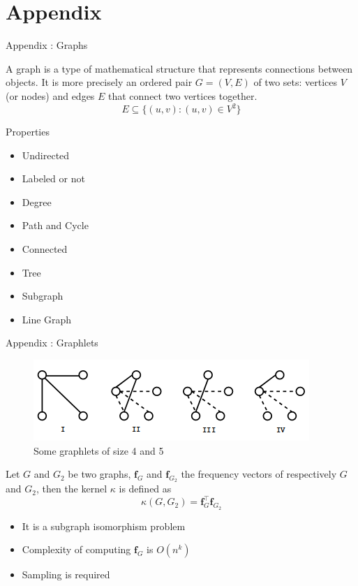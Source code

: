 \documentclass[compress]{beamer}
\let\vec\mathbf
\begin{document}
\section[]{Appendix}
\begin{frame}[noframenumbering]{Appendix : Graphs}
\begin{definition}
	A graph\cite{bondy1976graph} is a type of mathematical structure that represents connections between objects. It is more precisely an ordered pair $G=(V,E)$ of two sets: vertices $V$ (or nodes) and edges $E$ that connect two vertices together.
	\begin{equation*}
	E \subseteq \{(u,v) : (u,v) \in V^2\}
	\end{equation*}
\end{definition}
\begin{block}{Properties}
	\begin{multicols}{2}
		\begin{itemize}
			\item Undirected
			\item Labeled or not
			\item Degree
			\item Path and Cycle
		\end{itemize}
		\begin{itemize}
			\item Connected
			\item Tree
			\item Subgraph
			\item Line Graph
		\end{itemize}
	\end{multicols}
\end{block}
\end{frame}
\begin{frame}[noframenumbering]{Appendix : Graphlets}
\begin{figure}
\includegraphics[width=\linewidth]{data/graphlets.png}
\caption*{Some graphlets of size 4 and 5 \citep{shervashidze_efficient_2009}}
\end{figure}
\begin{definition}
Let $G$ and $G_2$ be two graphs, $\vec{f}_G$ and $\vec{f}_{G_2}$ the frequency vectors of respectively $G$ and $G_2$, then the kernel $\kappa$ is defined as
\begin{equation*}
\kappa(G,G_{2})=\vec{f}_{G}^{\top}\vec{f}_{G_2}
\end{equation*}
\end{definition}
\begin{itemize}
	\item It is a subgraph isomorphism problem
\item Complexity of computing $\vec{f}_G$ is $O(n^k)$
\item Sampling is required	
\end{itemize}
\end{frame}
\end{document}
